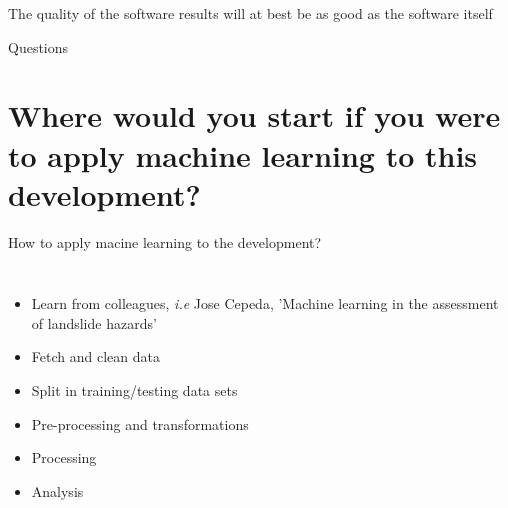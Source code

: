 \documentclass[usenames,dvipsnames]{beamer}
\theoremstyle{plain}
\theoremstyle{definition}
\begin{document}
\begin{frame}{\setframetitle{}}
  {
\centering
\Large  The quality of the software results will at best be as good as the software itself
}
\end{frame}


\appendix

\begin{frame}[label=questions]{Questions}
  \tableofcontents[hideallsubsections]
\end{frame}

\section{Where would you start if you were to apply machine learning to this development?}
\begin{appendixframe}{How to apply macine learning to the development?}
  \begin{columns}[t]
    
    \begin{itemize}
      \item Learn from colleagues, \textit{i.e} Jose Cepeda, 'Machine learning in the assessment of landslide hazards' 
      \item Fetch and clean data 
      \item Split in training/testing data sets 
      \item Pre-processing and transformations      
      \item Processing 
      \item Analysis 
    \end{itemize}
    
  \end{columns}
\end{appendixframe}
\end{document}
